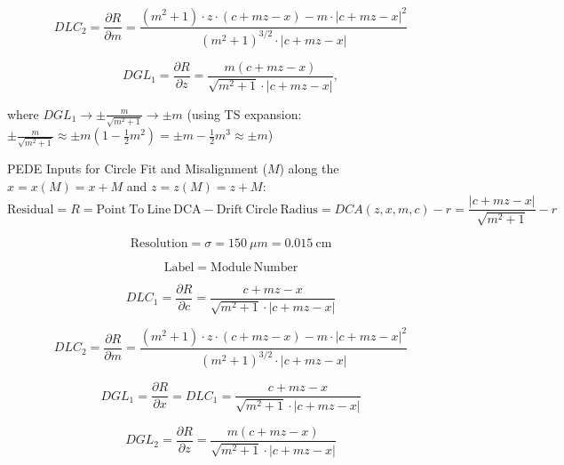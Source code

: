 \documentclass[a4paper,11pt]{article}
\begin{document}
\begin{equation}
DLC_2 = \frac{ \partial R}{\partial m} = \frac{ (m^2+1)\cdot z\cdot(c+mz-x) - m\cdot |c+mz-x|^2 }{ (m^2+1)^{3/2} \cdot |c+mz-x|  }
\end{equation}

\begin{equation}	
DGL_1 = \frac{\partial R}{\partial z} = \frac{ m(c+mz-x) }  { \sqrt{m^2+1} \cdot |c+mz-x| },
\end{equation}

 where $DGL_1 \rightarrow \pm \frac{m}{\sqrt{m^2+1}} \rightarrow \pm m$
(using TS expansion: $\pm \frac{m}{\sqrt{m^2+1}} \approx \pm m (1-\frac{1}{2}m^2) = \pm m - \frac{1}{2}m^3 \approx \pm m  $)

\clearpage

PEDE Inputs for Circle Fit and Misalignment ($M$) along the $x=x(M)=x+M$ and $z=z(M)=z+M$:
\begin{equation}	
\mathrm{Residual}= R =\mathrm{Point \ To \ Line \ DCA} - \mathrm{Drift \ Circle \ Radius} = DCA(z,x,m,c) - r = \frac{ |c+mz-x| }  { \sqrt{m^2+1} } -r
\end{equation}

\begin{equation}	
\mathrm{Resolution} = \sigma = 150 \ \mu m = 0.015 \ \mathrm{cm}
\end{equation}

\begin{equation}	
\mathrm{Label}= \mathrm{Module \ Number}
\end{equation}

\begin{equation}
DLC_1 = \frac{\partial R}{\partial c} = \frac{ c+mz-x }  { \sqrt{m^2+1} \cdot |c+mz-x| }
\end{equation}

\begin{equation}
DLC_2 = \frac{ \partial R}{\partial m} = \frac{ (m^2+1)\cdot z\cdot(c+mz-x) - m\cdot |c+mz-x|^2 }{ (m^2+1)^{3/2} \cdot |c+mz-x|  }
\end{equation}

\begin{equation}	
DGL_1 = \frac{\partial R}{\partial x} = DLC_1 = \frac{ c+mz-x }  { \sqrt{m^2+1} \cdot |c+mz-x| }
\end{equation}

\begin{equation}	
DGL_2 = \frac{\partial R}{\partial z} = \frac{ m(c+mz-x) }  { \sqrt{m^2+1} \cdot |c+mz-x| }
\end{equation}
\end{document}
